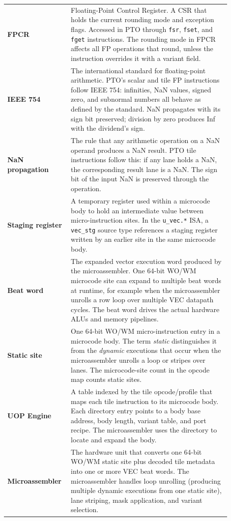 \begin{longtable}{@{}L{0.22\linewidth}L{0.68\linewidth}@{}}
\textbf{FPCR} & Floating-Point Control Register. A CSR that holds the current rounding mode and exception flags. Accessed in PTO through \texttt{fsr}, \texttt{fset}, and \texttt{fget} instructions. The rounding mode in FPCR affects all FP operations that round, unless the instruction overrides it with a variant field. \\
\textbf{IEEE 754} & The international standard for floating-point arithmetic. PTO's scalar and tile FP instructions follow IEEE 754: infinities, NaN values, signed zero, and subnormal numbers all behave as defined by the standard. NaN propagates with its sign bit preserved; division by zero produces Inf with the dividend's sign. \\
\textbf{NaN propagation} & The rule that any arithmetic operation on a NaN operand produces a NaN result. PTO tile instructions follow this: if any lane holds a NaN, the corresponding result lane is a NaN. The sign bit of the input NaN is preserved through the operation. \\
\textbf{Staging register} & A temporary register used within a microcode body to hold an intermediate value between micro-instruction sites. In the \texttt{u\_vec.*} ISA, a \texttt{vec\_stg} source type references a staging register written by an earlier site in the same microcode body. \\
\textbf{Beat word} & The expanded vector execution word produced by the microassembler. One 64-bit WO/WM microcode site can expand to multiple beat words at runtime, for example when the microassembler unrolls a row loop over multiple VEC datapath cycles. The beat word drives the actual hardware ALUs and memory pipelines. \\
\textbf{Static site} & One 64-bit WO/WM micro-instruction entry in a microcode body. The term \emph{static} distinguishes it from the \emph{dynamic} executions that occur when the microassembler unrolls a loop or stripes over lanes. The microcode-site count in the opcode map counts static sites. \\
\textbf{UOP Engine} & A table indexed by the tile opcode/profile that maps each tile instruction to its microcode body. Each directory entry points to a body base address, body length, variant table, and port recipe. The microassembler uses the directory to locate and expand the body. \\
\textbf{Microassembler} & The hardware unit that converts one 64-bit WO/WM static site plus decoded tile metadata into one or more VEC beat words. The microassembler handles loop unrolling (producing multiple dynamic executions from one static site), lane striping, mask application, and variant selection. \\

\end{longtable}
